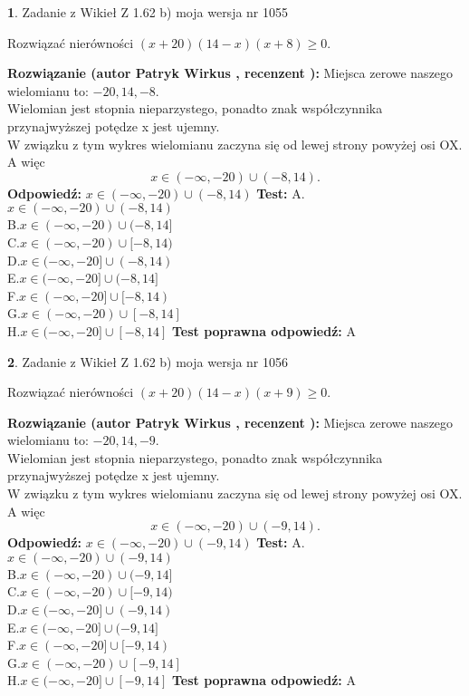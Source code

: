 \documentclass[12pt, a4paper]{article}
\theoremstyle{definition} %
\newtheorem{zad}{}
\newcommand{\zadStart}[1]{\begin{zad}#1\newline}
\newcommand{\zadStop}{\end{zad}}
\newcommand{\rozwStart}[2]{\noindent \textbf{Rozwiązanie (autor #1 , recenzent #2): }\newline}
\newcommand{\rozwStop}{\newline}
\newcommand{\odpStart}{\noindent \textbf{Odpowiedź:}\newline}
\newcommand{\odpStop}{\newline}
\newcommand{\testStart}{\noindent \textbf{Test:}\newline}
\newcommand{\testStop}{\newline}
\newcommand{\kluczStart}{\noindent \textbf{Test poprawna odpowiedź:}\newline}
\newcommand{\kluczStop}{\newline}
\begin{document}
\zadStart{Zadanie z Wikieł Z 1.62 b) moja wersja nr 1055}

Rozwiązać nierówności $(x+20)(14-x)(x+8)\ge0$.
\zadStop
\rozwStart{Patryk Wirkus}{}
Miejsca zerowe naszego wielomianu to: $-20, 14, -8$.\\
Wielomian jest stopnia nieparzystego, ponadto znak współczynnika przy\linebreak najwyższej potędze x jest ujemny.\\ W związku z tym wykres wielomianu zaczyna się od lewej strony powyżej osi OX. A więc $$x \in (-\infty,-20) \cup (-8,14).$$
\rozwStop
\odpStart
$x \in (-\infty,-20) \cup (-8,14)$
\odpStop
\testStart
A.$x \in (-\infty,-20) \cup (-8,14)$\\
B.$x \in (-\infty,-20) \cup (-8,14]$\\
C.$x \in (-\infty,-20) \cup [-8,14)$\\
D.$x \in (-\infty,-20] \cup (-8,14)$\\
E.$x \in (-\infty,-20] \cup (-8,14]$\\
F.$x \in (-\infty,-20] \cup [-8,14)$\\
G.$x \in (-\infty,-20) \cup [-8,14]$\\
H.$x \in (-\infty,-20] \cup [-8,14]$
\testStop
\kluczStart
A
\kluczStop



\zadStart{Zadanie z Wikieł Z 1.62 b) moja wersja nr 1056}

Rozwiązać nierówności $(x+20)(14-x)(x+9)\ge0$.
\zadStop
\rozwStart{Patryk Wirkus}{}
Miejsca zerowe naszego wielomianu to: $-20, 14, -9$.\\
Wielomian jest stopnia nieparzystego, ponadto znak współczynnika przy\linebreak najwyższej potędze x jest ujemny.\\ W związku z tym wykres wielomianu zaczyna się od lewej strony powyżej osi OX. A więc $$x \in (-\infty,-20) \cup (-9,14).$$
\rozwStop
\odpStart
$x \in (-\infty,-20) \cup (-9,14)$
\odpStop
\testStart
A.$x \in (-\infty,-20) \cup (-9,14)$\\
B.$x \in (-\infty,-20) \cup (-9,14]$\\
C.$x \in (-\infty,-20) \cup [-9,14)$\\
D.$x \in (-\infty,-20] \cup (-9,14)$\\
E.$x \in (-\infty,-20] \cup (-9,14]$\\
F.$x \in (-\infty,-20] \cup [-9,14)$\\
G.$x \in (-\infty,-20) \cup [-9,14]$\\
H.$x \in (-\infty,-20] \cup [-9,14]$
\testStop
\kluczStart
A
\kluczStop
\end{document}

